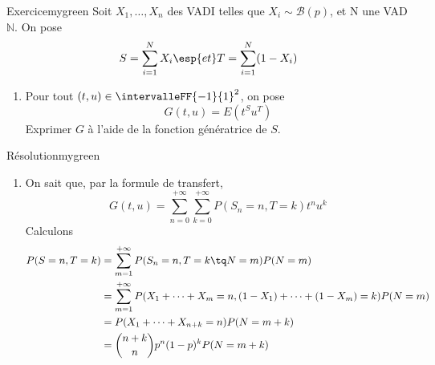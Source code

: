     \begin{omed}{Exercice}{mygreen}
        Soit $X_1,\ldots,X_n$ des VADI telles que $X_i \sim \mathcal{B}(p)$, et N une VAD$\mathbb{N}$. On pose 
        \[ S = \sum_{i=1}^{N} X_i \esp{et} T = \sum_{i=1}^{N} (1 - X_i) \]   
        \begin{enumerate}[label = (\alph*)]
            \item Pour tout $(t,u) \in \intervalleFF{-1}{1}^2$, on pose 
            \[ G(t,u) = E(t^S u^T) \]   
            Exprimer $G$ à l’aide de la fonction génératrice de $S$.
        \end{enumerate}
    \end{omed}

    \begin{demo}{Résolution}{mygreen}
        \begin{enumerate}[label = (\alph*)]
            \item On sait que, par la formule de transfert, 
            \[ G(t,u) = \sum_{n=0}^{+\infty} \sum_{k=0}^{+\infty} P(S_n = n, T = k) t^n u^k \]   
            Calculons
            \begin{align*}
                P(S = n, T = k) 
                &= \sum_{m=1}^{+\infty} P(S_n = n, T = k \tq N = m) P(N = m) \\
                &= \sum_{m=1}^{+\infty} P(X_1 + \cdots + X_m = n, (1- X_1) + \cdots + (1 - X_m) = k) P(N = m) \\
                &= P(X_1 + \cdots + X_{n + k} = n) P(N = m + k) \\
                &= \binom{n+k}{n} p^n (1 - p)^k P(N = m + k)
            \end{align*} 
        \end{enumerate}
    \end{demo}
















